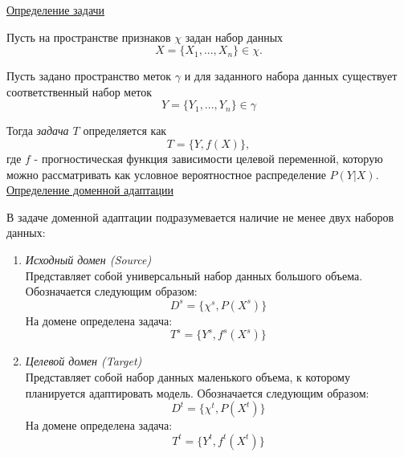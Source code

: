 \underline{Определение задачи}

Пусть на пространстве признаков $\chi$ задан набор данных
\begin{equation}
	X = \{X_1, ..., X_n\} \in \chi.
\end{equation}

Пусть задано пространство меток $\gamma$ и для заданного набора данных существует соответственный набор меток
\begin{equation}
Y = \{Y_1, ..., Y_n\} \in \gamma
\end{equation}

Тогда \textit{задача $T$} определяется как 
\begin{equation}
T = \{Y, f(X)\},
\end{equation}
где $f$ - прогностическая функция зависимости целевой переменной, которую можно рассматривать как условное вероятностное распределение $P(Y|X)$.\\

\underline{Определение доменной адаптации}

В задаче доменной адаптации подразумевается наличие не менее двух наборов данных:
\begin{enumerate}
\item \textit{Исходный домен (Source)}\\
Представляет собой универсальный набор данных большого объема. Обозначается следующим образом:
$$D^s = \{\chi^s, P(X^s)\}$$
На домене определена задача: $$T^s = \{Y^s, f^s(X^s)\}$$
\item \textit{Целевой домен (Target)}\\
Представляет собой набор данных маленького объема, к которому планируется адаптировать модель. Обозначается следующим образом:
$$D^t = \{\chi^t, P(X^t)\}$$
На домене определена задача: $$T^t = \{Y^t, f^t(X^t)\}$$
\end{enumerate}

